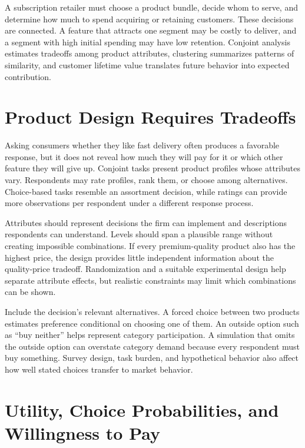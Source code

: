 \noindent A subscription retailer must choose a product bundle, decide whom to
serve, and determine how much to spend acquiring or retaining customers.
These decisions are connected. A feature that attracts one segment may
be costly to deliver, and a segment with high initial spending may have
low retention. Conjoint analysis estimates tradeoffs among product
attributes, clustering summarizes patterns of similarity, and customer
lifetime value translates future behavior into expected contribution.

\hypertarget{M04-product-design-requires-tradeoffs}{%
\section{Product Design Requires
Tradeoffs}\label{M04-product-design-requires-tradeoffs}}

\noindent Asking consumers whether they like fast delivery often produces a
favorable response, but it does not reveal how much they will pay for it
or which other feature they will give up. Conjoint tasks present product
profiles whose attributes vary. Respondents may rate profiles, rank
them, or choose among alternatives. Choice-based tasks resemble an
assortment decision, while ratings can provide more observations per
respondent under a different response process.

Attributes should represent decisions the firm can implement and
descriptions respondents can understand. Levels should span a plausible
range without creating impossible combinations. If every premium-quality
product also has the highest price, the design provides little
independent information about the quality-price tradeoff. Randomization
and a suitable experimental design help separate attribute effects, but
realistic constraints may limit which combinations can be shown.

Include the decision's relevant alternatives. A forced choice between
two products estimates preference conditional on choosing one of them.
An outside option such as ``buy neither'' helps represent category
participation. A simulation that omits the outside option can overstate
category demand because every respondent must buy something. Survey
design, task burden, and hypothetical behavior also affect how well
stated choices transfer to market behavior.

\hypertarget{M04-utility-choice-probabilities-and-willingness-to-pay}{%
\section{Utility, Choice Probabilities, and Willingness to
Pay}\label{M04-utility-choice-probabilities-and-willingness-to-pay}}

